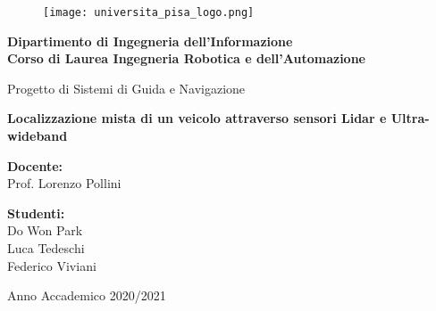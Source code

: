 \begin{titlepage}

\begin{figure}
	\centering
	\texttt{[image: universita\_pisa\_logo.png]} 
\end{figure}

\begin{center}
	\textbf{ Dipartimento di Ingegneria dell'Informazione\\
	Corso di Laurea Ingegneria Robotica e dell'Automazione\\}
	
	\vspace{30mm}
	
	{\large{Progetto di Sistemi di Guida e Navigazione}}\\
	
	\vspace{5mm}
	
	{\LARGE{\bf Localizzazione mista di un veicolo attraverso sensori Lidar e Ultra-wideband}}\\
\end{center}

\vspace{35mm}

\begin{minipage}[t]{0.4\textwidth}
	\textbf{Docente:}
	\\ Prof. Lorenzo Pollini
\end{minipage}
\begin{minipage}[t]{0.52\textwidth}\raggedleft
    \textbf{Studenti:}\\
    Do Won Park\\
    Luca Tedeschi\\
    Federico Viviani
\end{minipage}

\vspace{20mm}

\centering
Anno Accademico 2020/2021

\end{titlepage}
